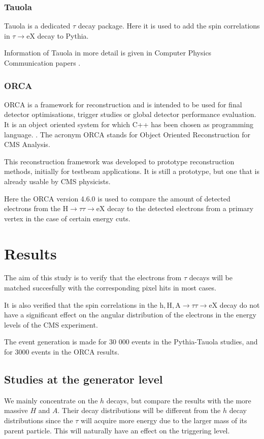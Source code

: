 \documentclass[a4paper,12pt,titlepage]{article}
\begin{document}
\subsubsection{Tauola}
Tauola is a dedicated $\tau$ decay package. Here it is used to add the spin correlations in $\tau \rightarrow \mathrm{eX}$ decay to Pythia. 

Information of Tauola in more detail is given in Computer Physics Communication papers \cite{CPC}.

\subsubsection{ORCA}
ORCA is a framework for reconstruction and is intended to be used for final detector optimisations, trigger studies or global detector performance evaluation. It is an object oriented system for which C++ has been chosen as programming language. \cite{ORCA}. The acronym ORCA stands for Object Oriented Reconstruction for CMS Analysis.

This reconstruction framework was developed to prototype reconstruction methods, initially for testbeam applications. It is still a prototype, but one that is already usable by CMS physicists. 

Here the ORCA version 4.6.0 is used to compare the amount of detected electrons from the $\mathrm{H} \rightarrow \tau \tau \rightarrow \mathrm{eX}$ decay to the detected electrons from a primary vertex in the case of certain energy cuts. 

\section{Results}
The aim of this study is to verify that the electrons from $\tau$ decays will be matched succesfully with the corresponding pixel hits in most cases. 

It is also verified that the spin correlations in the $\mathrm{h, H, A} \rightarrow \tau \tau \rightarrow \mathrm{eX}$ decay do not have a significant effect on the angular distribution of the electrons in the energy levels of the CMS experiment. 

The event generation is made for 30 000 events in the Pythia-Tauola studies, and for 3000 events in the ORCA results. 

\subsection{Studies at the generator level}
We mainly concentrate on the $h$ decays, but compare the results with the more massive $H$ and $A$. Their decay distributions will be different from the $h$ decay distributions since the $\tau$ will acquire more energy due to the larger mass of its parent particle. This will naturally have an effect on the triggering level. 
\end{document}

